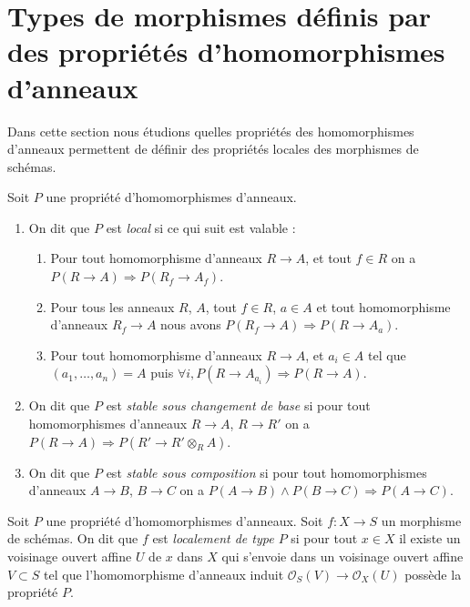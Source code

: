 \section{Types de morphismes définis par des propriétés d'homomorphismes d'anneaux}
\label{section-properties-ring-maps}

\noindent
Dans cette section nous étudions quelles propriétés des homomorphismes d'anneaux
permettent de définir des propriétés locales des morphismes de schémas.

\begin{definition}
\label{definition-property-local}
Soit $P$ une propriété d'homomorphismes d'anneaux.
\begin{enumerate}
\item On dit que $P$ est {\it local} si ce qui suit est valable :
\begin{enumerate}
\item Pour tout homomorphisme d'anneaux $R \to A$, et
tout $f \in R$ on a $P(R \to A) \Rightarrow P(R_f \to A_f)$.
\item Pour tous les anneaux $R$, $A$, tout $f \in R$, $a\in A$
et tout homomorphisme d'anneaux $R_f \to A$ nous avons $P(R_f \to A) \Rightarrow P(R \to A_a)$.
\item Pour tout homomorphisme d'anneaux $R \to A$,
et $a_i \in A$
tel que $(a_1, \ldots, a_n) = A$ puis $\forall i, P(R \to A_{a_i}) \Rightarrow P(R \to A)$.
\end{enumerate}
\item On dit que $P$ est {\it stable sous changement
de base} si pour tout homomorphismes
d'anneaux $R \to A$, $R \to R'$ on a $P(R \to A) \Rightarrow P(R' \to R' \otimes_R A)$.
\item On dit que $P$ est {\it stable sous composition}
si pour tout homomorphismes
d'anneaux $A \to B$, $B \to C$ on a $P(A \to B) \wedge P(B \to C) \Rightarrow P(A \to C)$.
\end{enumerate}
\end{definition}

\begin{definition}
\label{definition-locally-P}
Soit $P$ une propriété d'homomorphismes
d'anneaux. Soit $f : X \to S$ un morphisme de schémas. On dit
que $f$ est {\it localement de type $P$}
si pour tout $x \in X$ il existe un voisinage ouvert affine $U$
de $x$ dans $X$ qui s'envoie dans un voisinage ouvert affine
$V \subset S$ tel que l'homomorphisme d'anneaux induit $\mathcal{O}_S(V) \to \mathcal{O}_X(U)$ possède la
propriété $P$.
\end{definition}

